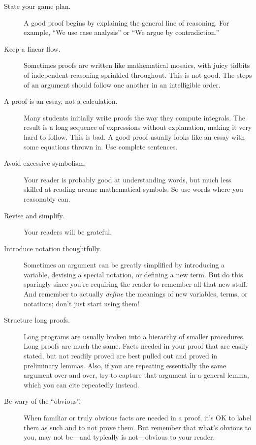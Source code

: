 \begin{description}

\item[State your game plan.]  A good proof begins by explaining the
  general line of reasoning. For example, ``We use case analysis'' or ``We
  argue by contradiction.''

\item[Keep a linear flow.]  Sometimes proofs are written like mathematical
  mosaics, with juicy tidbits of independent reasoning sprinkled
  throughout.  This is not good.  The steps of an argument should follow
  one another in an intelligible order.

\item[A proof is an essay, not a calculation.]  Many students initially
  write proofs the way they compute integrals.  The result is a long
  sequence of expressions without explanation, making it very hard to
  follow.  This is bad.  A good proof usually looks like an essay with
  some equations thrown in.  Use complete sentences.

\item[Avoid excessive symbolism.]  Your reader is probably good at
understanding words, but much less skilled at reading arcane
mathematical symbols.  So use words where you reasonably can.

\item[Revise and simplify.]  Your readers will be grateful.

\item[Introduce notation thoughtfully.]  Sometimes an argument can be
greatly simplified by introducing a variable, devising a special
notation, or defining a new term.  But do this sparingly since you're
requiring the reader to remember all that new stuff.  And remember to
actually \emph{define} the meanings of new variables, terms, or
notations; don't just start using them!

\item[Structure long proofs.]  Long programs are usually broken into a
hierarchy of smaller procedures.  Long proofs are much the same.
Facts needed in your proof that are easily stated, but not readily
proved are best pulled out and proved in preliminary lemmas.  Also, if
you are repeating essentially the same argument over and over, try to
capture that argument in a general lemma, which you can cite
repeatedly instead.

\item[Be wary of the ``obvious''.]  When familiar or truly obvious facts
  are needed in a proof, it's OK to label them as such and to not prove
  them.  But remember that what's obvious to you, may not be---and
  typically is not---obvious to your reader.


\end{description}
